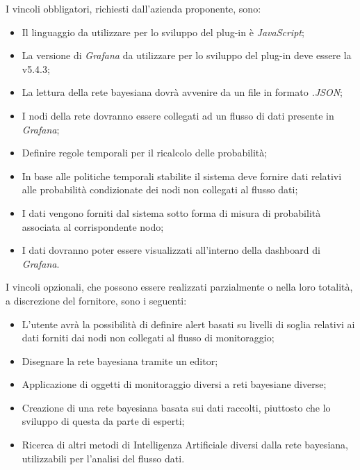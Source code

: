 I vincoli obbligatori, richiesti dall'azienda proponente, sono:
\begin{itemize}
	\item Il linguaggio da utilizzare per lo sviluppo del plug-in è \textit{JavaScript};
	\item La versione di \textit{Grafana} da utilizzare per lo sviluppo del plug-in deve essere la v5.4.3;
	\item La lettura della rete bayesiana dovrà avvenire da un file in formato \textit{.JSON};
	\item I nodi della rete dovranno essere collegati ad un flusso di dati presente in \textit{Grafana};
	\item Definire regole temporali per il ricalcolo delle probabilità;
	\item In base alle politiche temporali stabilite il sistema deve fornire dati relativi alle probabilità condizionate dei nodi non collegati al flusso dati;
	\item I dati vengono forniti dal sistema sotto forma di misura di probabilità associata al corrispondente nodo; 
	\item I dati dovranno poter essere visualizzati all'interno della dashboard di \textit{Grafana}.
\end{itemize}

I vincoli opzionali, che possono essere realizzati parzialmente o nella loro totalità, a discrezione del fornitore, sono i seguenti: 
\begin{itemize}
\item L'utente avrà la possibilità di definire alert basati su livelli di soglia relativi ai dati forniti dai nodi non collegati al flusso di monitoraggio;
\item Disegnare la rete bayesiana tramite un editor; 
\item Applicazione di oggetti di monitoraggio diversi a reti bayesiane diverse;
\item Creazione di una rete bayesiana basata sui dati raccolti, piuttosto che lo sviluppo di questa da parte di esperti; 
\item Ricerca di altri metodi di Intelligenza Artificiale diversi dalla rete bayesiana, utilizzabili per l'analisi del flusso dati. 
\end{itemize}
